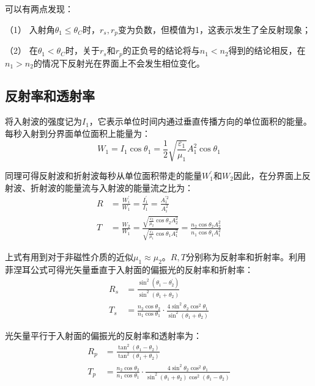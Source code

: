 \documentclass[UTF8]{ctexart}
\begin{document}
	可以有两点发现：
	
	（1） 入射角$ \theta_{1} \leq \theta_{C} $时，$ r_{s}, r_{p} $变为负数，但模值为1，这表示发生了全反射现象；
	
	（2） 在$ \theta_{1} < \theta_{C} $时，关于$ r_{s} $和$ r_{p} $的正负号的结论将与$ n_{1} < n_{2} $得到的结论相反，在$ n_{1} > n_{2} $的情况下反射光在界面上不会发生相位变化。
	
	\subsection{反射率和透射率}
	将入射波的强度记为$ I_{1} $，它表示单位时间内通过垂直传播方向的单位面积的能量。每秒入射到分界面单位面积上能量为：
	\begin{equation}
	W_{1}=I_{1} \cos \theta_{1}=\frac{1}{2} \sqrt{\frac{\varepsilon_{1}}{\mu_{1}}} A_{1}^{2} \cos \theta_{1}
	\end{equation}
	
	同理可得反射波和折射波每秒从单位面积带走的能量$ W_{1}^{\prime} $和$ W_{2} $因此，在分界面上反射波、折射波的能量流与入射波的能量流之比为：
	\begin{equation}
	\begin{aligned}
	R&=\frac{W_{i}^{\prime}}{W_{1}}=\frac{I_{1}^{\prime}}{I_{1}}=\frac{A_{1}^{\prime 2}}{A_{i}^{2}}
	\\
	T&= \frac{W_{2}}{W_{1}}=\frac{\sqrt{\frac{\varepsilon_{2}}{\mu_{2}} \cos \theta_{2} A_{2}^{2}}}{\sqrt{\frac{\varepsilon_{1}}{\mu_{1}} \cos \theta_{1} A_{1}^{2}}} = \frac{n_{2} \cos \theta_{2} A_{2}^{2}}{n_{1} \cos \theta_{1} A_{1}^{2}}
	\end{aligned}
	\end{equation}
	
\noindent 上式有用到对于非磁性介质的近似$ \mu_{1} \approx \mu_{2} $。$ R, T $分别称为反射率和折射率。利用菲涅耳公式可得光矢量垂直于入射面的偏振光的反射率和折射率：
\begin{equation}
	\begin{aligned}
	R_{s}&=\frac{\sin ^{2}\left(\theta_{1}-\theta_{2}^{\prime}\right)}{\sin ^{2}\left(\theta_{1}+\theta_{2}\right)}
	\\
	T_{s}&=\frac{n_{2} \cos \theta_{2}}{n_{1} \cos \theta_{1}} \cdot \frac{4 \sin ^{2} \theta_{2} \cos ^{2} \theta_{1}}{\sin ^{2}\left(\theta_{1}+\theta_{2}\right)}
	\end{aligned}
\end{equation}

\noindent 光矢量平行于入射面的偏振光的反射率和透射率为：
\begin{equation}
	\begin{aligned}
	R_{p}&=\frac{\tan ^{2}\left(\theta_{1}-\theta_{2}\right)}{\tan ^{2}\left(\theta_{1}+\theta_{2}\right)}
	\\
	T_{p}&=\frac{n_{2} \cos \theta_{2}}{n_{1} \cos \theta_{1}} \cdot \frac{4 \sin ^{2} \theta_{2} \cos ^{2} \theta_{1}}{\sin ^{2}\left(\theta_{1}+\theta_{2}\right) \cos ^{2}\left(\theta_{1}-\theta_{2}\right)}
	\end{aligned}
\end{equation}
\end{document}
